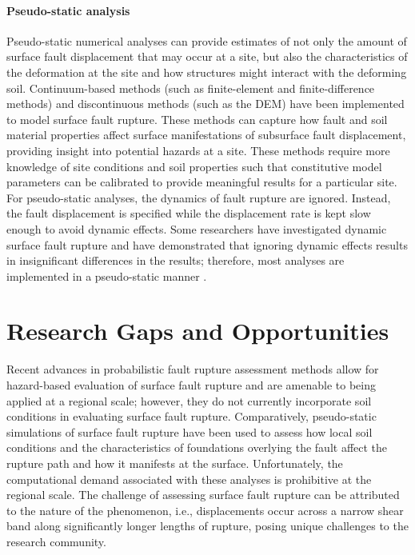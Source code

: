 \paragraph{Pseudo-static analysis}
Pseudo-static numerical analyses can provide estimates of not only the amount of surface fault displacement that may occur at a site, but also the characteristics of the deformation at the site and how structures might interact with the deforming soil. Continuum-based methods (such as finite-element and finite-difference methods) and discontinuous methods (such as the DEM) have been implemented to model surface fault rupture. These methods can capture how fault and soil material properties affect surface manifestations of subsurface fault displacement, providing insight into potential hazards at a site. These methods require more knowledge of site conditions and soil properties such that constitutive model parameters can be calibrated to provide meaningful results for a particular site. For pseudo-static analyses, the dynamics of fault rupture are ignored. Instead, the fault displacement is specified while the displacement rate is kept slow enough to avoid dynamic effects. Some researchers have investigated dynamic surface fault rupture \citep{oettle2015dynamic} and have demonstrated that ignoring dynamic effects results in insignificant differences in the results; therefore, most analyses are implemented in a pseudo-static manner \citep{anastasopoulos2007foundation, anastasopoulos2008numerical, bransby2008centrifuge_reverse, bransby2008centrifuge, oettle2013geotechnical, oettle2017numerical, garcia2018distinct, garcia2018distinct_2}.

\section{Research Gaps and Opportunities}
\label{sec:eq_surface_rup_research_gaps}
Recent advances in probabilistic fault rupture assessment methods allow for hazard-based evaluation of surface fault rupture and are amenable to being applied at a regional scale; however, they do not currently incorporate soil conditions in evaluating surface fault rupture. Comparatively, pseudo-static simulations of surface fault rupture have been used to assess how local soil conditions and the characteristics of foundations overlying the fault affect the rupture path and how it manifests at the surface. Unfortunately, the computational demand associated with these analyses is prohibitive at the regional scale. The challenge of assessing surface fault rupture can be attributed to the nature of the phenomenon, i.e., displacements occur across a narrow shear band along significantly longer lengths of rupture, posing unique challenges to the research community.

